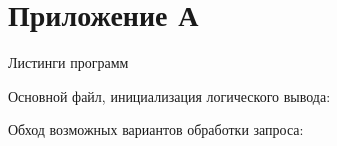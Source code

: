\chapter*{Приложение А}
\centerline{Листинги программ}

Основной файл, инициализация логического вывода:


Обход возможных вариантов обработки запроса:


